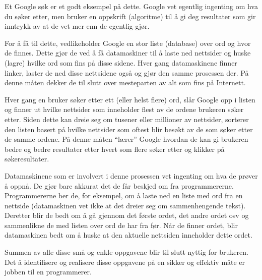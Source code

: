 Et Google søk er et godt eksempel på dette. Google vet egentlig ingenting om hva du søker etter, men bruker en oppskrift (algoritme) til å gi deg resultater som gir inntrykk av at de vet mer enn de egentlig gjør.

For å få til dette, vedlikeholder Google en stor liste (database) over ord og hvor de finnes. Dette gjør de ved å få datamaskiner til å laste ned nettsider og huske (lagre) hvilke ord som fins på disse sidene. Hver gang datamaskinene finner linker, laster de ned disse nettsidene også og gjør den samme prosessen der. På denne måten dekker de til slutt over mesteparten av alt som fins på Internett.

Hver gang en bruker søker etter ett (eller helst flere) ord, slår Google opp i listen og finner ut hvilke nettsider som inneholder flest av de ordene brukeren søker etter. Siden dette kan dreie seg om tusener eller millioner av nettsider, sorterer den listen basert på hvilke nettsider som oftest blir besøkt av de som søker etter de samme ordene. På denne måten ``lærer'' Google hvordan de kan gi brukeren bedre og bedre resultater etter hvert som flere søker etter og klikker på søkeresultater.

Datamaskinene som er involvert i denne prosessen vet ingenting om hva de prøver å oppnå. De gjør bare akkurat det de får beskjed om fra programmererne. Programmererne ber de, for eksempel, om å laste ned en liste med ord fra en nettside (datamaskinen vet ikke at det dreier seg om sammenhengende tekst). Deretter blir de bedt om å gå gjennom det første ordet, det andre ordet osv og sammenlikne de med listen over ord de har fra før. Når de finner ordet, blir datamaskinen bedt om å huske at den aktuelle nettsiden inneholder dette ordet.

Summen av alle disse små og enkle oppgavene blir til slutt nyttig for brukeren. Det å identifisere og realisere disse oppgavene på en sikker og effektiv måte er jobben til en programmerer.